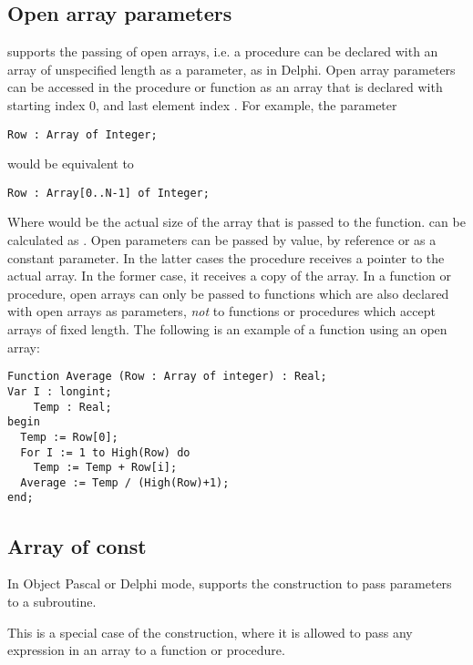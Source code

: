 \subsection{Open array parameters}
\label{se:openarray}
\fpc supports the passing of open arrays, i.e. a procedure can be declared
with an array of unspecified length as a parameter, as in Delphi.
Open array parameters can be accessed in the procedure or function as an
array that is declared with starting index 0, and last element
index .
For example, the parameter
\begin{verbatim}
Row : Array of Integer;
\end{verbatim}
would be equivalent to
\begin{verbatim}
Row : Array[0..N-1] of Integer;
\end{verbatim}
Where   would be the actual size of the array that is passed to the
function.  can be calculated as .
Open parameters can be passed by value, by reference or as a constant
parameter. In the latter cases the procedure receives a pointer to the
actual array. In the former case, it receives a copy of the array.
In a function or procedure, open arrays can only be passed to functions which
are also declared with open arrays as parameters, {\em not} to functions or
procedures which accept arrays of fixed length.
The following is an example of a function using an open array:
\begin{verbatim}
Function Average (Row : Array of integer) : Real;
Var I : longint;
    Temp : Real;
begin
  Temp := Row[0];
  For I := 1 to High(Row) do
    Temp := Temp + Row[i];
  Average := Temp / (High(Row)+1);
end;
\end{verbatim}
\subsection{Array of const}
In Object Pascal or Delphi mode, \fpc supports the 
construction to pass parameters to a subroutine.

This is a special case of the  construction, where it is
allowed to pass any expression in an array to a function or procedure.

